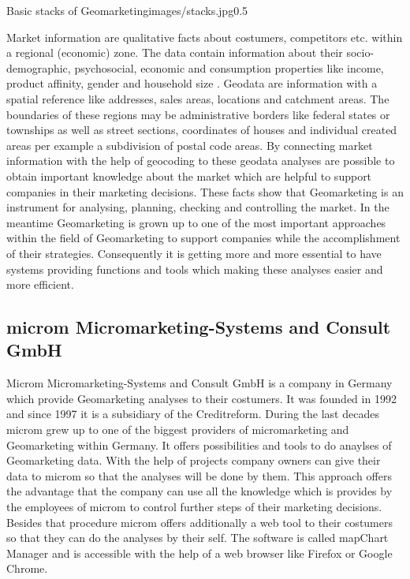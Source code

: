 \begin{figurevarSize}{Basic stacks of Geomarketing}{images/stacks.jpg}{0.5}\end{figurevarSize}

Market information are qualitative facts about costumers, competitors etc. within a regional (economic) zone. The data contain information about their socio-demographic, psychosocial, economic and consumption properties like income, product affinity, gender and household size \cite{tappert}. Geodata are information with a spatial reference like addresses, sales areas, locations and catchment areas. The boundaries of these regions may be administrative borders like federal states or townships as well as street sections, coordinates of houses and individual created areas per example a subdivision of postal code areas. By connecting market information with the help of geocoding to these geodata analyses are possible to obtain important knowledge about the market which are helpful to support companies in their marketing decisions. These facts show that Geomarketing is an instrument for analysing, planning, checking and controlling the market. In the meantime Geomarketing is grown up to one of the most important approaches within the field of Geomarketing to support companies while the accomplishment of their strategies. Consequently it is getting more and more essential to have systems providing functions and tools which making these analyses easier and more efficient. 

\subsection{microm Micromarketing-Systems and Consult GmbH}
Microm Micromarketing-Systems and Consult GmbH is a company in Germany which provide Geomarketing analyses to their costumers. It was founded in 1992 and since 1997 it is a subsidiary of the Creditreform. During the last decades microm grew up to one of the biggest providers of micromarketing and Geomarketing within Germany. It offers possibilities and tools to do anaylses of Geomarketing data. With the help of projects company owners can give their data to microm so that the analyses will be done by them. This approach offers the advantage that the company can use all the knowledge which is provides by the employees of microm to control further steps of their marketing decisions. Besides that procedure microm offers additionally a web tool to their costumers so that they can do the analyses by their self. The software is called mapChart Manager and is accessible with the help of a web browser like Firefox or Google Chrome. 

